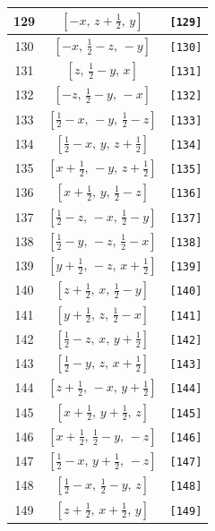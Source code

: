 \documentclass[fleqn,8pt]{jsarticle}
\begin{document}
\begin{longtable}{ccc}
129 & $\left[ - x,\, z + \frac{1}{2},\, y \right]$ & {\tt [129]} \\ \hline
130 & $\left[ - x,\, \frac{1}{2} - z,\, - y \right]$ & {\tt [130]} \\ \hline
131 & $\left[ z,\, \frac{1}{2} - y,\, x \right]$ & {\tt [131]} \\ \hline
132 & $\left[ - z,\, \frac{1}{2} - y,\, - x \right]$ & {\tt [132]} \\ \hline
133 & $\left[ \frac{1}{2} - x,\, - y,\, \frac{1}{2} - z \right]$ & {\tt [133]} \\ \hline
134 & $\left[ \frac{1}{2} - x,\, y,\, z + \frac{1}{2} \right]$ & {\tt [134]} \\ \hline
135 & $\left[ x + \frac{1}{2},\, - y,\, z + \frac{1}{2} \right]$ & {\tt [135]} \\ \hline
136 & $\left[ x + \frac{1}{2},\, y,\, \frac{1}{2} - z \right]$ & {\tt [136]} \\ \hline
137 & $\left[ \frac{1}{2} - z,\, - x,\, \frac{1}{2} - y \right]$ & {\tt [137]} \\ \hline
138 & $\left[ \frac{1}{2} - y,\, - z,\, \frac{1}{2} - x \right]$ & {\tt [138]} \\ \hline
139 & $\left[ y + \frac{1}{2},\, - z,\, x + \frac{1}{2} \right]$ & {\tt [139]} \\ \hline
140 & $\left[ z + \frac{1}{2},\, x,\, \frac{1}{2} - y \right]$ & {\tt [140]} \\ \hline
141 & $\left[ y + \frac{1}{2},\, z,\, \frac{1}{2} - x \right]$ & {\tt [141]} \\ \hline
142 & $\left[ \frac{1}{2} - z,\, x,\, y + \frac{1}{2} \right]$ & {\tt [142]} \\ \hline
143 & $\left[ \frac{1}{2} - y,\, z,\, x + \frac{1}{2} \right]$ & {\tt [143]} \\ \hline
144 & $\left[ z + \frac{1}{2},\, - x,\, y + \frac{1}{2} \right]$ & {\tt [144]} \\ \hline
145 & $\left[ x + \frac{1}{2},\, y + \frac{1}{2},\, z \right]$ & {\tt [145]} \\ \hline
146 & $\left[ x + \frac{1}{2},\, \frac{1}{2} - y,\, - z \right]$ & {\tt [146]} \\ \hline
147 & $\left[ \frac{1}{2} - x,\, y + \frac{1}{2},\, - z \right]$ & {\tt [147]} \\ \hline
148 & $\left[ \frac{1}{2} - x,\, \frac{1}{2} - y,\, z \right]$ & {\tt [148]} \\ \hline
149 & $\left[ z + \frac{1}{2},\, x + \frac{1}{2},\, y \right]$ & {\tt [149]} \\ \hline

\end{longtable}
\end{document}
